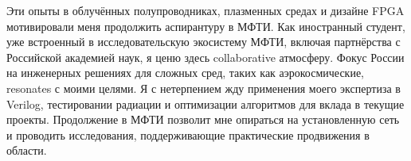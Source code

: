 \documentclass[a4paper,11pt]{article}
\begin{document}
\vspace{10pt}

Эти опыты в облучённых полупроводниках, плазменных средах и дизайне FPGA мотивировали меня продолжить аспирантуру в МФТИ. Как иностранный студент, уже встроенный в исследовательскую экосистему МФТИ, включая партнёрства с Российской академией наук, я ценю здесь collaborative атмосферу. Фокус России на инженерных решениях для сложных сред, таких как аэрокосмические, resonates с моими целями. Я с нетерпением жду применения моего экспертиза в Verilog, тестировании радиации и оптимизации алгоритмов для вклада в текущие проекты. Продолжение в МФТИ позволит мне опираться на установленную сеть и проводить исследования, поддерживающие практические продвижения в области.

\vspace{10pt}


\end{document}
